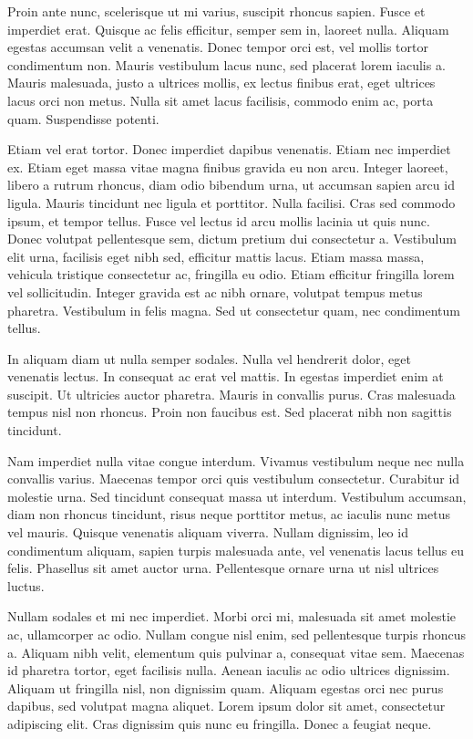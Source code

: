 \documentclass{article}
\begin{document}
Proin ante nunc, scelerisque ut mi varius, suscipit rhoncus sapien. Fusce et imperdiet erat. Quisque ac felis efficitur, semper sem in, laoreet nulla. Aliquam egestas accumsan velit a venenatis. Donec tempor orci est, vel mollis tortor condimentum non. Mauris vestibulum lacus nunc, sed placerat lorem iaculis a. Mauris malesuada, justo a ultrices mollis, ex lectus finibus erat, eget ultrices lacus orci non metus. Nulla sit amet lacus facilisis, commodo enim ac, porta quam. Suspendisse potenti.

Etiam vel erat tortor. Donec imperdiet dapibus venenatis. Etiam nec imperdiet ex. Etiam eget massa vitae magna finibus gravida eu non arcu. Integer laoreet, libero a rutrum rhoncus, diam odio bibendum urna, ut accumsan sapien arcu id ligula. Mauris tincidunt nec ligula et porttitor. Nulla facilisi. Cras sed commodo ipsum, et tempor tellus. Fusce vel lectus id arcu mollis lacinia ut quis nunc. Donec volutpat pellentesque sem, dictum pretium dui consectetur a. Vestibulum elit urna, facilisis eget nibh sed, efficitur mattis lacus. Etiam massa massa, vehicula tristique consectetur ac, fringilla eu odio. Etiam efficitur fringilla lorem vel sollicitudin. Integer gravida est ac nibh ornare, volutpat tempus metus pharetra. Vestibulum in felis magna. Sed ut consectetur quam, nec condimentum tellus.

In aliquam diam ut nulla semper sodales. Nulla vel hendrerit dolor, eget venenatis lectus. In consequat ac erat vel mattis. In egestas imperdiet enim at suscipit. Ut ultricies auctor pharetra. Mauris in convallis purus. Cras malesuada tempus nisl non rhoncus. Proin non faucibus est. Sed placerat nibh non sagittis tincidunt.

Nam imperdiet nulla vitae congue interdum. Vivamus vestibulum neque nec nulla convallis varius. Maecenas tempor orci quis vestibulum consectetur. Curabitur id molestie urna. Sed tincidunt consequat massa ut interdum. Vestibulum accumsan, diam non rhoncus tincidunt, risus neque porttitor metus, ac iaculis nunc metus vel mauris. Quisque venenatis aliquam viverra. Nullam dignissim, leo id condimentum aliquam, sapien turpis malesuada ante, vel venenatis lacus tellus eu felis. Phasellus sit amet auctor urna. Pellentesque ornare urna ut nisl ultrices luctus.

Nullam sodales et mi nec imperdiet. Morbi orci mi, malesuada sit amet molestie ac, ullamcorper ac odio. Nullam congue nisl enim, sed pellentesque turpis rhoncus a. Aliquam nibh velit, elementum quis pulvinar a, consequat vitae sem. Maecenas id pharetra tortor, eget facilisis nulla. Aenean iaculis ac odio ultrices dignissim. Aliquam ut fringilla nisl, non dignissim quam. Aliquam egestas orci nec purus dapibus, sed volutpat magna aliquet. Lorem ipsum dolor sit amet, consectetur adipiscing elit. Cras dignissim quis nunc eu fringilla. Donec a feugiat neque.
\end{document}
